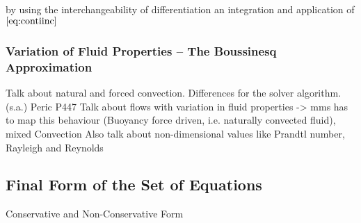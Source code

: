       by using the interchangeability of differentiation an integration and application of \(\ref{eq:contiinc}\)

      \subsubsection{Variation of Fluid Properties -- The Boussinesq Approximation}
      Talk about natural and forced convection. Differences for the solver algorithm. (s.a.) Peric P447
      Talk about flows with variation in fluid properties -> mms has to map this behaviour (Buoyancy force driven, i.e. naturally convected fluid), mixed Convection
      Also talk about non-dimensional values like Prandtl number, Rayleigh and Reynolds
    \subsection{Final Form of the Set of Equations}
        Conservative and Non-Conservative Form
